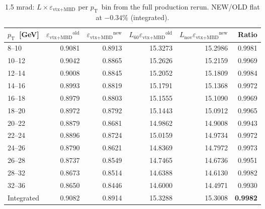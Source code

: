 \documentclass[11pt,letterpaper]{article}
\newcommand{\pT}{\ensuremath{p_{\text{T}}}}
\newcommand{\veff}{\ensuremath{\varepsilon_{\text{vtx+MBD}}}}
\begin{document}
\begin{table}[H]
\centering
\caption{1.5 mrad: $L \times \veff$ per \pT\ bin from the full
  production rerun. NEW/OLD flat at $-0.34\%$ (integrated).}
\label{tab:perbin_1p5}
\small
\begin{tabular}{lrrrrr}
\toprule
\textbf{\pT\ [GeV]} & \textbf{$\veff^{\text{old}}$}
  & \textbf{$\veff^{\text{new}}$}
  & \textbf{$L_{60} \veff^{\text{old}}$}
  & \textbf{$L_{\text{nov}} \veff^{\text{new}}$}
  & \textbf{Ratio} \\
\midrule
8--10    & 0.9081 & 0.8913 & 15.3273 & 15.2986 & 0.9981 \\
10--12   & 0.9042 & 0.8865 & 15.2626 & 15.2159 & 0.9969 \\
12--14   & 0.9008 & 0.8845 & 15.2052 & 15.1809 & 0.9984 \\
14--16   & 0.8993 & 0.8819 & 15.1791 & 15.1368 & 0.9972 \\
16--18   & 0.8979 & 0.8803 & 15.1555 & 15.1090 & 0.9969 \\
18--20   & 0.8972 & 0.8792 & 15.1443 & 15.0912 & 0.9965 \\
20--22   & 0.8879 & 0.8681 & 14.9862 & 14.9008 & 0.9943 \\
22--24   & 0.8896 & 0.8724 & 15.0159 & 14.9734 & 0.9972 \\
24--26   & 0.8790 & 0.8621 & 14.8369 & 14.7972 & 0.9973 \\
26--28   & 0.8737 & 0.8549 & 14.7465 & 14.6736 & 0.9951 \\
28--32   & 0.8673 & 0.8514 & 14.6388 & 14.6130 & 0.9982 \\
32--36   & 0.8650 & 0.8446 & 14.6000 & 14.4971 & 0.9930 \\
\midrule
Integrated & 0.9082 & 0.8914 & 15.3288 & 15.3008 & \textbf{0.9982} \\
\bottomrule
\end{tabular}
\end{table}
\end{document}
